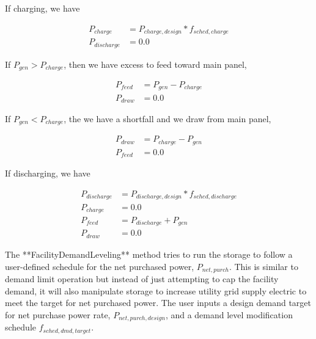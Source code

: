 If charging, we have  

\begin{equation}
  \begin{array}{rl}
    {P_{charge}} &= {P_{charge,design}} * {f_{sched,charge}} \\
    {P_{discharge}} &= 0.0
  \end{array}
\end{equation}

If $ {P_{gen}} > {P_{charge}} $,  then we have excess to feed toward main panel,

\begin{equation}
  \begin{array}{rl}
    {P_{feed}} &= {P_{gen}} - {P_{charge}} \\
    {P_{draw}} &= 0.0
  \end{array}
\end{equation}

If $ {P_{gen}} < {P_{charge}} $, the we have a shortfall and we draw from main panel,

\begin{equation}
  \begin{array}{rl}
    {P_{draw}} &= {P_{charge}} - {P_{gen}} \\
    {P_{feed}} &= 0.0
  \end{array}
\end{equation}

If discharging, we have 

\begin{equation}
  \begin{array}{rl}
    {P_{discharge}} &= {P_{discharge,design}} * {f_{sched,discharge}} \\
    {P_{charge}} &= 0.0 \\
    {P_{feed}} &= {P_{discharge}} + {P_{gen}} \\
    {P_{draw}} &= 0.0
  \end{array}
\end{equation}

The **FacilityDemandLeveling** method tries to run the storage to follow a user-defined schedule for the net purchased power, $ {P_{net,purch}}  $.  This is similar to demand limit operation but instead of just attempting to cap the facility demand, it will also manipulate storage to increase utility grid supply electric to meet the target for net purchased power.  The user inputs a design demand target for net purchase power rate, $ {P_{net,purch,design}}  $, and a demand level modification schedule $ {f_{sched,dmd,target}} $.  

